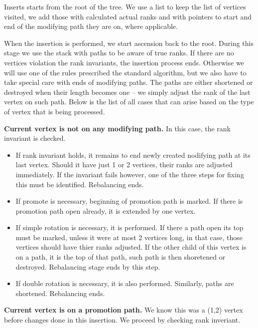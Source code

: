 Inserts starts from the root of the tree. We use a list to keep the list of vertices visited, we add those with calculated actual ranks and with pointers to start and end of the modifying path they are on, where applicable.



When the insertion is performed, we start ascension back to the root. During this stage we use the stack with paths to be aware of true ranks. If there are no vertices violation the rank invariants, the insertion process ends. Otherwise we will use one of the rules prescribed the standard algorithm, but we also have to take special care with ends of modifying paths. The paths are either shortened or destroyed when their length becomes one -- we simply adjust the rank of the last vertex on such path. Below is the list of all cases that can arise based on the type of vertex that is being processed.

\textbf{Current vertex is not on any modifying path.} In this case, the rank invariant is checked. 

\begin{itemize}

\item If rank invariant holds, it remains to end newly created nodifying path at its last vertex. Should it have just 1 or 2 vertices, their ranks are adjusted immediately. If the invariant fails however, one of the three steps for fixing this must be identified. Rebalancing ends.

\item If promote is necessary, beginning of promotion path is marked. If there is promotion path open already, it is extended by one vertex.

\item If simple rotation is necessary, it is performed. If there a path open its top must be marked, unless it were at most 2 vertices long, in that case, those vertices should have thier ranks adjusted. If the other child of this vertex is on a path, it is the top of that path, such path is then shoretened or destroyed. Rebalancing stage ends by this step.

\item If double rotation is necessary, it is also performed. Similarly, paths are shortened. Rebalancing ends.

\end{itemize}

\textbf{Current vertex is on a promotion path.} We know this was a (1,2) vertex before changes done in this insertion. We proceed by checking rank inveriant. 

